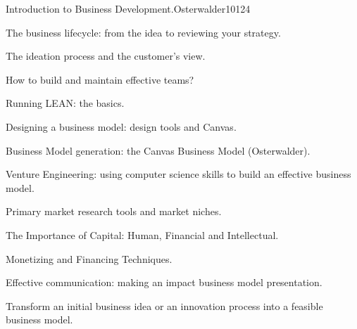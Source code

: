 \begin{syllabus}
\begin{unit}{Introduction to Business Development.}{}{Osterwalder10}{12}{4}
   \begin{topics}
      \item The business lifecycle: from the idea to reviewing your strategy.
      \item The ideation process and the customer’s view.
      \item How to build and maintain effective teams?
      \item Running LEAN: the basics.
      \item Designing a business model: design tools and Canvas.
      \item Business Model generation: the Canvas Business Model (Osterwalder).
      \item Venture Engineering: using computer science skills to build an effective business model.
      \item Primary market research tools and market niches.
      \item The Importance of Capital: Human, Financial and Intellectual.
      \item Monetizing and Financing Techniques.
      \item Effective communication: making an impact business model presentation.
   \end{topics}
   \begin{learningoutcomes}
      \item Transform an initial business idea or an innovation process into a feasible business model.
   \end{learningoutcomes}
\end{unit}




\begin{coursebibliography}
\end{coursebibliography}

\end{syllabus}
